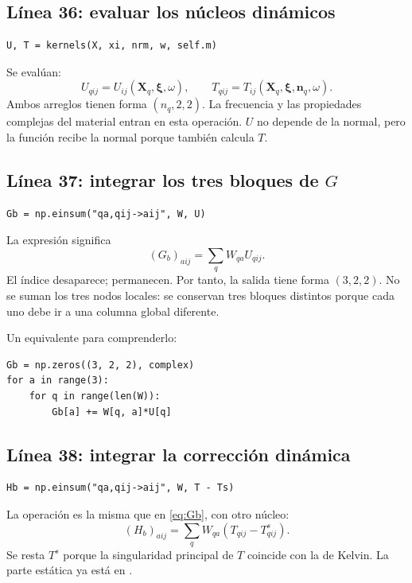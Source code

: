 \documentclass[11pt,a4paper]{article}
\numberwithin{equation}{section}
\newcommand{\vect}[1]{\bm{#1}}
\DeclareRobustCommand{\code}[1]{\texttt{\detokenize{#1}}}
\begin{document}
\subsection{L\'inea 36: evaluar los n\'ucleos din\'amicos}
\begin{lstlisting}
U, T = kernels(X, xi, nrm, w, self.m)
\end{lstlisting}
Se eval\'uan:
\begin{equation}
 U_{qij}=U_{ij}(\vect X_q,\vect\xi,\omega),\qquad
 T_{qij}=T_{ij}(\vect X_q,\vect\xi,\vect n_q,\omega).
\end{equation}
Ambos arreglos tienen forma $(n_q,2,2)$.
La frecuencia y las propiedades complejas del material entran en
esta operaci\'on.
$U$ no depende de la normal, pero la funci\'on recibe la normal
porque tambi\'en calcula $T$.

\subsection{L\'inea 37: integrar los tres bloques de \texorpdfstring{$G$}{G}}
\begin{lstlisting}
Gb = np.einsum("qa,qij->aij", W, U)
\end{lstlisting}
La expresi\'on significa
\begin{equation}
 \boxed{(G_b)_{aij}=\sum_qW_{qa}U_{qij}.}
 \label{eq:Gb}
\end{equation}
El \'indice \code{q} desaparece; \code{a,i,j} permanecen.
Por tanto, la salida tiene forma $(3,2,2)$.
No se suman los tres nodos locales: se conservan tres bloques distintos
porque cada uno debe ir a una columna global diferente.

Un equivalente para comprenderlo:
\begin{lstlisting}
Gb = np.zeros((3, 2, 2), complex)
for a in range(3):
    for q in range(len(W)):
        Gb[a] += W[q, a]*U[q]
\end{lstlisting}

\subsection{L\'inea 38: integrar la correcci\'on din\'amica}
\begin{lstlisting}
Hb = np.einsum("qa,qij->aij", W, T - Ts)
\end{lstlisting}
La operaci\'on es la misma que en \eqref{eq:Gb}, con otro n\'ucleo:
\begin{equation}
 (H_b)_{aij}=\sum_qW_{qa}(T_{qij}-T^s_{qij}).
\end{equation}
Se resta $T^s$ porque la singularidad principal de $T$ coincide
con la de Kelvin. La parte est\'atica ya est\'a en \code{self.Hs}.
\end{document}

